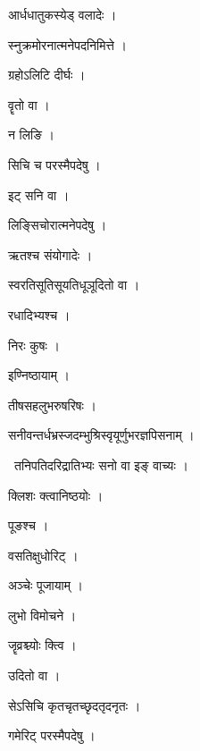 \documentclass[10pt, openany, oneside]{book}
\begin{document}
\noindent आर्धधातुकस्येड् वलादेः ।

\noindent स्नुक्रमोरनात्मनेपदनिमित्ते ।

\noindent ग्रहोऽलिटि दीर्घः ।

\noindent वॄतो वा ।

\noindent न लिङि ।

\noindent सिचि च परस्मैपदेषु ।

\noindent इट् सनि वा ।

\noindent लिङ्सिचोरात्मनेपदेषु ।

\noindent ऋतश्च संयोगादेः ।

\noindent स्वरतिसूतिसूयतिधूञूदितो वा ।

\noindent रधादिभ्यश्च ।

\noindent निरः कुषः ।

\noindent इण्निष्ठायाम् ।

\noindent तीषसहलुभरुषरिषः ।

\noindent सनीवन्तर्धभ्रस्जदम्भुश्रिस्वृयूर्णुभरज्ञपिसनाम् ।

\par\noindent\hspace{1.5em}{\vps वा॰}~{\qt तनिपतिदरिद्रातिभ्यः सनो वा इङ् वाच्यः ।}

\noindent क्लिशः क्त्वानिष्ठयोः ।

\noindent पूङश्च ।

\noindent वसतिक्षुधोरिट् ।

\noindent अञ्चेः पूजायाम् ।

\noindent लुभो विमोचने ।

\noindent जॄव्रश्च्योः क्त्वि ।

\noindent उदितो वा ।

\noindent सेऽसिचि कृतचृतच्छृदतृदनृतः ।

\noindent गमेरिट् परस्मैपदेषु ।
\end{document}

